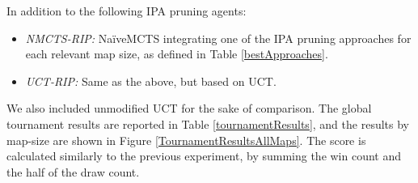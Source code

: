\documentclass[conference]{IEEEtran}
\begin{document}
In addition to the following IPA pruning agents:

\begin{itemize}
\item \textit{NMCTS-RIP:} NaïveMCTS integrating one of the IPA pruning approaches for each relevant map size, as defined in Table \ref{bestApproaches}.
\item \textit{UCT-RIP:} Same as the above, but based on UCT.
\end{itemize}

We also included unmodified UCT for the sake of comparison. The global tournament results are reported in Table \ref{tournamentResults}, and the results by map-size are shown in Figure \ref{TournamentResultsAllMaps}. The score is calculated similarly to the previous experiment, by summing the win count and the half of the draw count.
\end{document}
